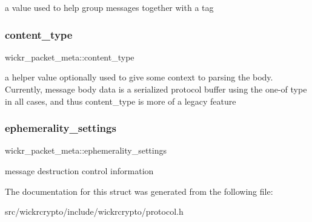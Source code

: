 a value used to help group messages together with a tag \mbox{\label{structwickr__packet__meta_ada659f7c31d257c76edab5db52973f6e}} 
\subsubsection{\texorpdfstring{content\+\_\+type}{content\_type}}
{\footnotesize\ttfamily wickr\+\_\+packet\+\_\+meta\+::content\+\_\+type}

a helper value optionally used to give some context to parsing the body. Currently, message body data is a serialized protocol buffer using the one-\/of type in all cases, and thus content\+\_\+type is more of a legacy feature \mbox{\label{structwickr__packet__meta_a0ef43c179038ba036fc9db17976b8b1e}} 
\subsubsection{\texorpdfstring{ephemerality\+\_\+settings}{ephemerality\_settings}}
{\footnotesize\ttfamily wickr\+\_\+packet\+\_\+meta\+::ephemerality\+\_\+settings}

message destruction control information 

The documentation for this struct was generated from the following file\+:\begin{DoxyCompactItemize}
\item 
src/wickrcrypto/include/wickrcrypto/protocol.\+h\end{DoxyCompactItemize}
